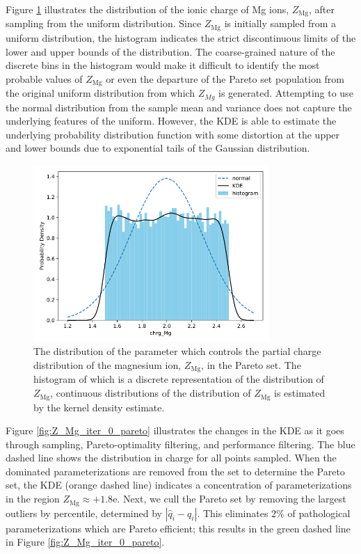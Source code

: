 Figure \ref{fig:Z_Mg_iter_0} illustrates the distribution of the ionic charge of Mg ions, $Z_{\text{Mg}}$, after sampling from the uniform distribution.  Since $Z_{\text{Mg}}$ is initially sampled from a uniform distribution, the histogram indicates the strict discontinuous limits of the lower and upper bounds of the distribution.  The coarse-grained nature of the discrete bins in the histogram would make it difficult to identify the most probable values of $Z_{\text{Mg}}$ or even the departure of the Pareto set population from the original uniform distribution from which $Z_{Mg}$ is generated.  Attempting to use the normal distribution from the sample mean and variance does not capture the underlying features of the uniform.  However, the KDE is able to estimate the underlying probability distribution function with some distortion at the upper and lower bounds due to exponential tails of the Gaussian distribution.

\begin{figure}[ht]
	\centering
  \includegraphics[width=0.8\textwidth]{chapter7/Z_Mg_iter_0}
  \caption{The distribution of the parameter which controls the partial charge distribution of the magnesium ion, $Z_{\text{Mg}}$, in the Pareto set. The histogram of which is a discrete representation of the distribution of $Z_{\text{Mg}}$, continuous distributions of the distribution of $Z_{\text{Mg}}$ is estimated by the kernel density estimate.}
  \label{fig:Z_Mg_iter_0}
\end{figure}

Figure \ref{fig:Z_Mg_iter_0_pareto} illustrates the changes in the KDE as it goes through sampling, Pareto-optimality filtering, and performance filtering.  The blue dashed line shows the distribution in charge for all points sampled. When the dominated parameterizations are removed from the set to determine the Pareto set, the KDE (orange dashed line) indicates a concentration of parameterizations in the region $Z_{\text{Mg}} \approx +1.8 \text{e}$.  Next, we cull the Pareto set by removing the largest outliers by percentile, determined by $|\hat{q}_i -q_i|$.  This eliminates $2$\% of pathological parameterizations which are Pareto efficient; this results in the green dashed line in Figure \ref{fig:Z_Mg_iter_0_pareto}.

